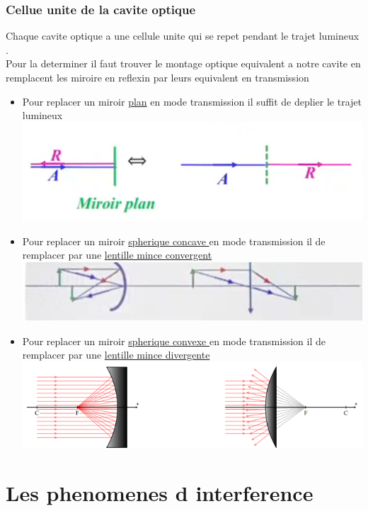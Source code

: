 \documentclass[12pt]{book}
\begin{document}
        \subsection{Cellue unite de la cavite optique}
        Chaque cavite optique a une cellule unite qui se repet pendant le trajet lumineux .\\
        Pour la determiner il faut trouver le montage optique equivalent a notre cavite en remplacent les miroire en reflexin par leurs equivalent en transmission
        \begin{itemize}
            \item Pour replacer un miroir \underline{plan} en mode transmission il suffit de deplier le trajet lumineux
               \\ \includegraphics[width = 0.6\linewidth]{pic/celluleplan.png}
            \item Pour replacer un miroir \underline{spherique concave } en mode transmission il de remplacer par une \underline{lentille mince convergent}
              \\  \includegraphics[width = 0.6\linewidth]{pic/celluleconcave.png}
            \item Pour replacer un miroir \underline{spherique convexe } en mode transmission il de remplacer par une \underline{lentille mince divergente}
               \\ \includegraphics[width = 0.6\linewidth]{pic/celluleconvexe.png}
        \end{itemize}
    \chapter{Les phenomenes d interference}
\end{document}
